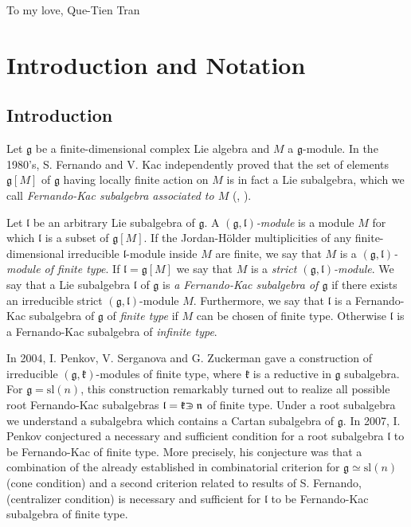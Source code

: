 \documentclass[12pt]{report}
\newcommand{\kk}{\mathfrak{k}}
\newcommand{\nn}{\mathfrak{n}}
\newcommand{\gG}{\mathfrak{g}}
\newcommand{\lL}{\mathfrak{l}}
\newcommand{\sL}{\mathrm{sl}}
\def\crplus{\hbox{$\supset${\raise1.05pt\hbox{\kern -0.60em ${\scriptscriptstyle +}$}}\ }}
\begin{document}
\thispagestyle{empty}


To my love, Que-Tien Tran
\newpage
\tableofcontents
\chapter{Introduction and Notation}
\section{Introduction}

Let $\gG$ be a finite-dimensional complex Lie algebra and $M$ a $\gG$-module. In the 1980's, S. Fernando and V. Kac independently proved that the set of elements $\gG[M]$ of $\gG$ having locally finite action on $M$ is in fact a Lie subalgebra, which we call \emph{Fernando-Kac subalgebra associated to $M$} (\cite{Kac:FernandoKacSubalgebra},  \cite{Fernando1}).

Let $\lL$ be an arbitrary Lie subalgebra of $\gG$. A \emph{$(\gG,\lL)$-module} is a module $M$ for which $\lL$ is a subset of $\gG[M]$. If the Jordan-H\"older multiplicities of any finite-dimensional irreducible $\lL$-module inside $M$ are finite, we say that $M$ is a \emph{$(\gG,\lL)$-module of finite type}. If $\lL=\gG[M]$ we say that $M$ is a \emph{strict $(\gG,\lL)$-module}. We say that a Lie subalgebra $\lL$ of $\gG$ is \emph{a Fernando-Kac subalgebra of $\gG$} if there exists an irreducible strict $(\gG,\lL)$-module $M$. Furthermore, we say that $\lL$ is a Fernando-Kac subalgebra of $\gG$ of \emph{finite type} if $M$ can be chosen of finite type. Otherwise $\lL$ is a Fernando-Kac subalgebra of \emph{infinite type}.

In 2004, I. Penkov, V. Serganova and G. Zuckerman gave a construction of irreducible $(\gG,\kk)$-modules of finite type, where $\kk$ is a reductive in $\gG$ subalgebra. For $\gG=\sL(n)$, this construction remarkably turned out to realize all possible root Fernando-Kac subalgebras $\lL=\kk\crplus\nn$ of finite type. Under a root subalgebra we understand a subalgebra which contains a Cartan subalgebra of $\gG$. In 2007, I. Penkov conjectured a necessary and sufficient condition for a root subalgebra $\lL$ to be Fernando-Kac of finite type. More precisely, his conjecture was that a combination of the already established in \cite{PSZ} combinatorial criterion for $\gG\simeq\sL(n)$ (cone condition) and a second criterion related to results of S. Fernando, \cite{Fernando1} (centralizer condition) is necessary and sufficient for $\lL$ to be Fernando-Kac subalgebra of finite type.
\end{document}
